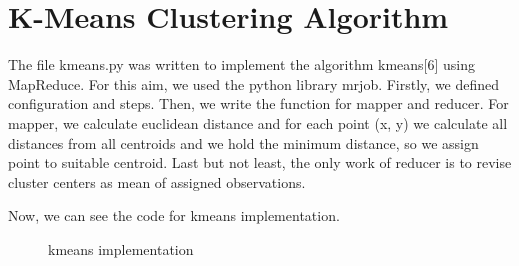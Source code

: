 \documentclass[11pt]{article}
\begin{document}
	
	
	\newpage
	\section{K-Means Clustering Algorithm}
	
	The file kmeans.py was written to implement the algorithm kmeans[6] using MapReduce. For this aim, we used the python library mrjob. Firstly, we defined configuration and steps. Then, we write the function for mapper and reducer. For mapper, we calculate euclidean distance and for each point (x, y) we calculate all distances from all centroids and we hold the minimum distance, so we assign point to suitable centroid. Last but not least, the only work of reducer is to revise cluster centers as mean of assigned observations.
	
	Now, we can see the code for kmeans implementation. 
	
	\begin{figure}[H]
		\caption{kmeans implementation}
	\end{figure}
	
\end{document}
